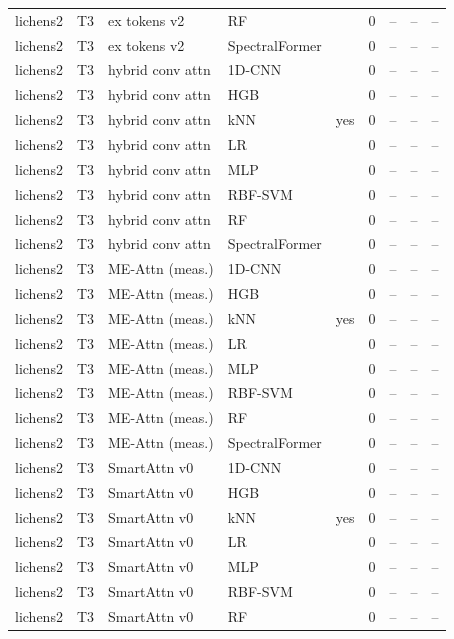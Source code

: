 \begin{tabular}{lllllcccc}
lichens2 & T3 & ex tokens v2 & RF &  & 0 & -- & -- & -- \\
lichens2 & T3 & ex tokens v2 & SpectralFormer &  & 0 & -- & -- & -- \\
lichens2 & T3 & hybrid conv attn & 1D-CNN &  & 0 & -- & -- & -- \\
lichens2 & T3 & hybrid conv attn & HGB &  & 0 & -- & -- & -- \\
lichens2 & T3 & hybrid conv attn & kNN & yes & 0 & -- & -- & -- \\
lichens2 & T3 & hybrid conv attn & LR &  & 0 & -- & -- & -- \\
lichens2 & T3 & hybrid conv attn & MLP &  & 0 & -- & -- & -- \\
lichens2 & T3 & hybrid conv attn & RBF-SVM &  & 0 & -- & -- & -- \\
lichens2 & T3 & hybrid conv attn & RF &  & 0 & -- & -- & -- \\
lichens2 & T3 & hybrid conv attn & SpectralFormer &  & 0 & -- & -- & -- \\
lichens2 & T3 & ME-Attn (meas.) & 1D-CNN &  & 0 & -- & -- & -- \\
lichens2 & T3 & ME-Attn (meas.) & HGB &  & 0 & -- & -- & -- \\
lichens2 & T3 & ME-Attn (meas.) & kNN & yes & 0 & -- & -- & -- \\
lichens2 & T3 & ME-Attn (meas.) & LR &  & 0 & -- & -- & -- \\
lichens2 & T3 & ME-Attn (meas.) & MLP &  & 0 & -- & -- & -- \\
lichens2 & T3 & ME-Attn (meas.) & RBF-SVM &  & 0 & -- & -- & -- \\
lichens2 & T3 & ME-Attn (meas.) & RF &  & 0 & -- & -- & -- \\
lichens2 & T3 & ME-Attn (meas.) & SpectralFormer &  & 0 & -- & -- & -- \\
lichens2 & T3 & SmartAttn v0 & 1D-CNN &  & 0 & -- & -- & -- \\
lichens2 & T3 & SmartAttn v0 & HGB &  & 0 & -- & -- & -- \\
lichens2 & T3 & SmartAttn v0 & kNN & yes & 0 & -- & -- & -- \\
lichens2 & T3 & SmartAttn v0 & LR &  & 0 & -- & -- & -- \\
lichens2 & T3 & SmartAttn v0 & MLP &  & 0 & -- & -- & -- \\
lichens2 & T3 & SmartAttn v0 & RBF-SVM &  & 0 & -- & -- & -- \\
lichens2 & T3 & SmartAttn v0 & RF &  & 0 & -- & -- & -- \\

\end{tabular}
